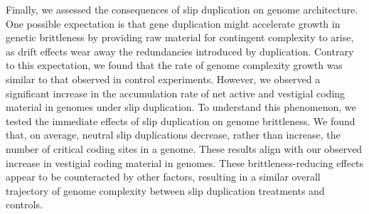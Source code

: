 Finally, we assessed the consequences of slip duplication on genome architecture.
One possible expectation is that gene duplication might accelerate growth in genetic brittleness by providing raw material for contingent complexity to arise, as drift effects wear away the redundancies introduced by duplication.
Contrary to this expectation, we found that the rate of genome complexity growth was similar to that observed in control experiments.
However, we observed a significant increase in the accumulation rate of net active and vestigial coding material in genomes under slip duplication.
To understand this phenomenon, we tested the immediate effects of slip duplication on genome brittleness.
We found that, on average, neutral slip duplications decrease, rather than increase, the number of critical coding sites in a genome.
These results align with our observed increase in vestigial coding material in genomes.
These brittleness-reducing effects appear to be counteracted by other factors, resulting in a similar overall trajectory of genome complexity between slip duplication treatments and controls.
